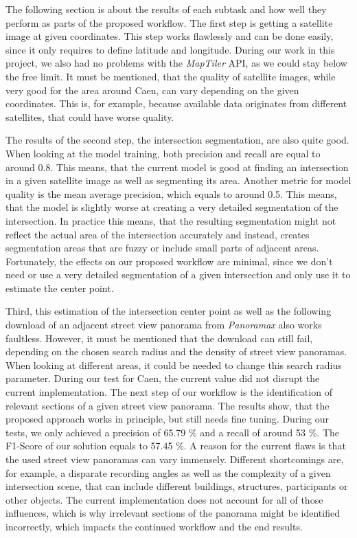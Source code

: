 The following section is about the results of each subtask and how well they
perform as parts of the proposed workflow.
The first step is getting a satellite image at given coordinates.
This step works flawlessly and can be done easily, since it only requires to
define latitude and longitude. During our work in this project, we also had no
problems with the \textit{MapTiler} API, as we could stay below the free limit.
It must be mentioned, that the quality of satellite images, while very good for
the area around Caen, can vary depending on the given coordinates.
This is, for example, because available data originates from different
satellites, that could have worse quality.

The results of the second step, the intersection segmentation, are also quite good.
When looking at the model training, both precision and recall are equal to around 0.8.
This means, that the current model is good at finding an intersection in a given
satellite image as well as segmenting its area.
Another metric for model quality is the mean average precision, which equals to
around 0.5.
This means, that the model is slightly worse at creating a very detailed
segmentation of the intersection. In practice this means, that the resulting
segmentation might not reflect the actual area of the intersection accurately
and instead, creates segmentation areas that are fuzzy or include small parts of
adjacent areas. Fortunately, the effects on our proposed workflow are minimal,
since we don’t need or use a very detailed segmentation of a given intersection
and only use it to estimate the center point.

Third, this estimation of the intersection center point as well as the following
download of an adjacent street view panorama from \textit{Panoramax} also works
faultless.
However, it must be mentioned that the download can still fail, depending on the
chosen search radius and the density of street view panoramas.
When looking at different areas, it could be needed to change this search radius
parameter.
During our test for Caen, the current value did not disrupt the current implementation.
The next step of our workflow is the identification of relevant sections of a
given street view panorama.
The results show, that the proposed approach works in principle, but still needs
fine tuning.
During our tests, we only achieved a precision of 65.79 \% and a recall of
around 53 \%.
The F1-Score of our solution equals to 57.45 \%.
A reason for the current flaws is that the used street view panoramas can vary
immensely. Different shortcomings are, for example, a disparate recording angles
as well as the complexity of a given intersection scene, that can include
different buildings, structures, participants or other objects.
The current implementation does not account for all of those influences, which
is why irrelevant sections of the panorama might be identified incorrectly,
which impacts the continued workflow and the end results.

